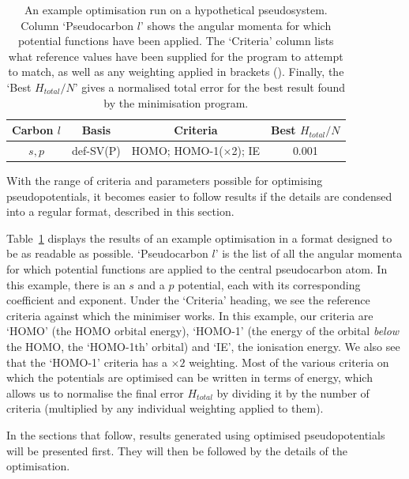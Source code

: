 \documentclass[aip,reprint,nofootinbib]{revtex4-1}
\begin{document}
\begin{table}[h]
\begin{center}
\caption[An example pseudopotential optimisation table.]{An example optimisation run on a hypothetical pseudosystem. Column `Pseudocarbon $l$' shows the angular momenta for which potential functions have been applied. The `Criteria' column lists what reference values have been supplied for the program to attempt to match, as well as any weighting applied in brackets (). Finally, the `Best $H_{total}/N$' gives a normalised total error for the best result found by the minimisation program.}\label{tab:exampleopt}
\begin{tabular}{| c | c | c | c |}
\hline
\textbf{Carbon $l$} & 
\textbf{Basis} & 
\textbf{Criteria} & 
\textbf{Best $H_{total}/N$}\\
\hline
$s,p$ & def-SV(P) & \multicolumn{1}{m{3cm}}{\centering HOMO; HOMO-1($\times$2); IE} & 0.001 \\
\hline
\end{tabular}
\end{center}
\end{table}

With the range of criteria and parameters possible for optimising pseudopotentials, it becomes easier to follow results if the details are condensed into a regular format, described in this section.

Table~\ref{tab:exampleopt} displays the results of an example optimisation in a format designed to be as readable as possible. `Pseudocarbon $l$' is the list of all the angular momenta for which potential functions are applied to the central pseudocarbon atom. In this example, there is an $s$ and a $p$ potential, each with its corresponding coefficient and exponent. Under the `Criteria' heading, we see the reference criteria against which the minimiser works. In this example, our criteria are `HOMO' (the HOMO orbital energy), `HOMO-1' (the energy of the orbital \textit{below} the HOMO, the `HOMO-1th' orbital) and `IE', the ionisation energy. We also see that the `HOMO-1' criteria has a $\times2$ weighting. Most of the various criteria on which the potentials are optimised can be written in terms of energy, which allows us to normalise the final error $H_{total}$ by dividing it by the number of criteria (multiplied by any individual weighting applied to them).

In the sections that follow, results generated using optimised pseudopotentials will be presented first. They will then be followed by the details of the optimisation.
\end{document}

